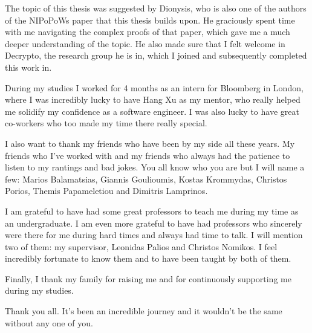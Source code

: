 \documentclass{report}
\begin{document}
The topic of this thesis was suggested by Dionysis, who is also one of the authors of the NIPoPoWs paper that this thesis builds upon. He graciously spent time with me navigating the complex proofs of that paper, which gave me a much deeper understanding of the topic. He also made sure that I felt welcome in Decrypto, the research group he is in, which I joined and subsequently completed this work in.

During my studies I worked for 4 months as an intern for Bloomberg in London, where I was incredibly lucky to have Hang Xu as my mentor, who really helped me solidify my confidence as a software engineer. I was also lucky to have great co-workers who too made my time there really special.

I also want to thank my friends who have been by my side all these years. My friends who I've worked with and my friends who always had the patience to listen to my rantings and bad jokes. You all know who you are but I will name a few: Marios Balamatsias, Giannis Goulioumis, Kostas Krommydas, Christos Porios, Themis Papameletiou and Dimitris Lamprinos.

I am grateful to have had some great professors to teach me during my time as an undergraduate. I am even more grateful to have had professors who sincerely were there for me during hard times and always had time to talk. I will mention two of them: my supervisor, Leonidas Palios and Christos Nomikos. I feel incredibly fortunate to know them and to have been taught by both of them.

Finally, I thank my family for raising me and for continuously supporting me during my studies.

Thank you all. It's been an incredible journey and it wouldn't be the same without any one of you.

\newpage

\tableofcontents

\newpage








\end{document}
